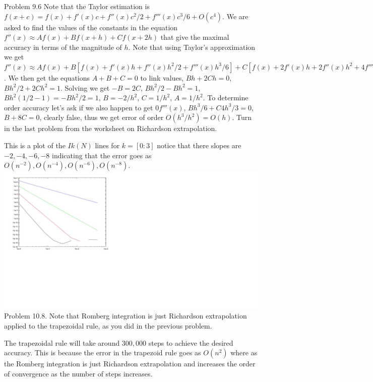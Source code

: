 \documentclass[12pt]{article}
\makeatletter
\theoremstyle{homework}
\newenvironment{exercise}[1]
{\def\@currentlabel{#1}\exercisecore}
{\endexercisecore}
\makeatother
\begin{document}
\begin{exercise}
1
Problem 9.6
\end{exercise}
Note that the Taylor estimation is $f(x+c)= f(x) + f'(x)c+ f''(x)c^2/2+f'''(x)c^3/6+O(c^4)$.  We are asked to find the values of the constants in the equation $f''(x)\approx Af(x)+Bf(x+h)+Cf(x+2h)$ that give the maximal accuracy in terms of the magnitude of $h$.  Note that using Taylor's approximation we get $f''(x)\approx Af(x)+B[f(x) + f'(x)h+ f''(x)h^2/2+f'''(x)h^3/6]+C[f(x) + 2f'(x)h+ 2f''(x)h^2+4f'''(x)h^3/3]+O(h^4)$.  We then get the equations $A+B+C=0$ to link values, $Bh+2Ch=0$, $Bh^2/2+2Ch^2=1$.  Solving we get $-B=2C$, $Bh^2/2-Bh^2=1$, $Bh^2(1/2-1)=-Bh^2/2=1$, $B=-2/h^2$, $C=1/h^2$, $A=1/h^2$.  To determine order accuracy let's ask if we also happen to get $0f'''(x)$, $Bh^3/6+C4h^3/3=0$, $B+8C=0$, clearly false, thus we get error of order $O(h^3/h^2)=O(h)$.
\begin{exercise}
2
Turn in the last problem from the worksheet on Richardson extrapolation.
\end{exercise}


This is a plot of the $Ik(N)$ lines for $k=[0:3]$ notice that there slopes are $-2,-4,-6,-8$ indicating that the error goes as $O(n^{-2}),O(n^{-4}),O(n^{-6}),O(n^{-8})$.\\
\includegraphics[scale=.6]{../octave/f1.jpg}
\begin{exercise}
3
Problem 10.8. Note that Romberg integration is just Richardson extrapolation applied to the trapezoidal rule, as you did in the previous problem.
\end{exercise}

The trapezoidal rule will take around $300,000$ steps to achieve the desired accuracy.  This is because the error in the trapezoid rule goes as $O(n^2)$ where as the Romberg integration is just Richardson extrapolation and increases the order of convergence as the number of steps increases.
\end{document}
